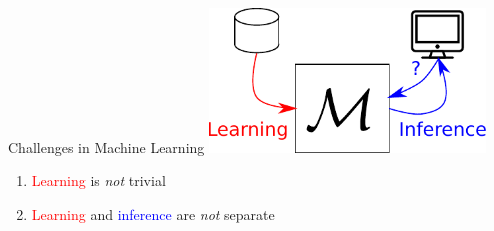 \documentclass{beamer}
\newcommand{\tred}[1]{\textcolor{red}{#1}}
\newcommand{\tblue}[1]{\textcolor{blue}{#1}}
\begin{document}
\begin{frame}{Challenges in Machine Learning}
    \centering
    \includegraphics[width=0.55\textwidth]{machinelearning.pdf}

    \vspace{4mm}
    \raggedright
    \begin{enumerate}
        \item \tred{Learning} is \emph{not} trivial 
        \item \tred{Learning} and \tblue{inference} are \emph{not} separate
    \end{enumerate}
\end{frame}
\end{document}
